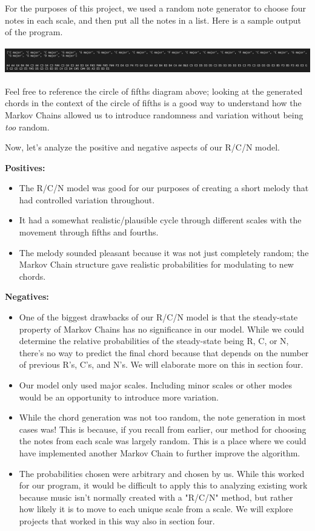 \documentclass{article}
\begin{document}
For the purposes of this project, we used a random note generator to choose four notes in each scale, and then put all the notes in a list. Here is a sample output of the program.

\begin{center}
    \includegraphics[height=1.2cm]{outputcode}
\end{center}

Feel free to reference the circle of fifths diagram above; looking at the generated chords in the context of the circle of fifths is a good way to understand how the Markov Chains allowed us to introduce randomness and variation without being \textit{too} random.

Now, let's analyze the positive and negative aspects of our R/C/N model.

\textbf{Positives:}
\begin{itemize}
    \item The R/C/N model was good for our purposes of creating a short melody that had controlled variation throughout.
    \item It had a somewhat realistic/plausible cycle through different scales with the movement through fifths and fourths.
    \item The melody sounded pleasant because it was not just completely random; the Markov Chain structure gave realistic probabilities for modulating to new chords.
\end{itemize}

\textbf{Negatives:}
\begin{itemize}
    \item One of the biggest drawbacks of our R/C/N model is that the steady-state property of Markov Chains has no significance in our model. While we could determine the relative probabilities of the steady-state being R, C, or N, there's no way to predict the final chord because that depends on the number of previous R's, C's, and N's. We will elaborate more on this in section four.
    \item Our model only used major scales. Including minor scales or other modes would be an opportunity to introduce more variation.
    \item While the chord generation was not too random, the note generation in most cases was! This is because, if you recall from earlier, our method for choosing the notes from each scale was largely random. This is a place where we could have implemented another Markov Chain to further improve the algorithm.
    \item The probabilities chosen were arbitrary and chosen by us. While this worked for our program, it would be difficult to apply this to analyzing existing work because music isn't normally created with a "R/C/N" method, but rather how likely it is to move to each unique scale from a scale. We will explore projects that worked in this way also in section four.
\end{itemize}
\end{document}
